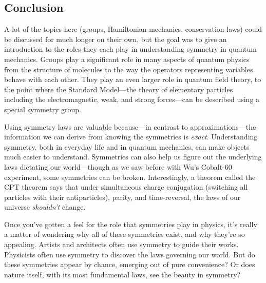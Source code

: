 \subsection*{Conclusion}
A lot of the topics here (groups, Hamiltonian mechanics, conservation laws) could be discussed for much longer on their own, but the goal was to give an introduction to the roles they each play in understanding symmetry in quantum mechanics. Groups play a significant role in many aspects of quantum physics from the structure of molecules to the way the operators representing variables behave with each other. They play an even larger role in quantum field theory, to the point where the Standard Model---the theory of elementary particles including the electromagnetic, weak, and strong forces---can be described using a special symmetry group. 

Using symmetry laws are valuable because---in contrast to approximations---the information we can derive from knowing the symmetries is \emph{exact}. Understanding symmetry, both in everyday life and in quantum mechanics, can make objects much easier to understand. Symmetries can also help us figure out the underlying laws dictating our world---though as we saw before with Wu's Cobalt-60 experiment, some symmetries can be broken. Interestingly, a theorem called the CPT theorem says that under simultaneous charge conjugation (switching all particles with their antiparticles), parity, and time-reversal, the laws of our universe \emph{shouldn't} change.

Once you've gotten a feel for the role that symmetries play in physics, it's really a matter of wondering why all of these symmetries exist, and why they're so appealing. Artists and architects often use symmetry to guide their works. Physicists often use symmetry to discover the laws governing our world. But do these symmetries appear by chance, emerging out of pure convenience? Or does nature itself, with its most fundamental laws, see the beauty in symmetry?
